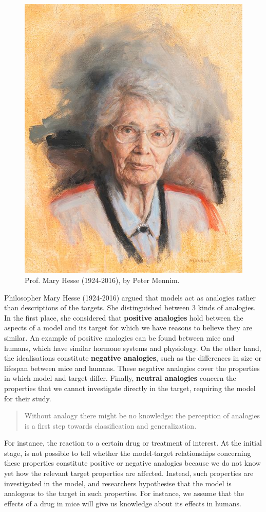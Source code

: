 \documentclass[
]{book}
\begin{document}
\begin{figure}  
 \begin{center}
    \includegraphics[width=.33\textwidth]{Figures/mary-hesse.jpeg}  
  \captionsetup{labelformat=empty}
  \caption{Prof. Mary Hesse (1924-2016), by Peter Mennim.} 
\end{center}
\end{figure}
\addtocounter{figure}{-1}

Philosopher Mary Hesse (1924-2016) argued that models act as analogies rather than descriptions of the targets. She distinguished between 3 kinds of analogies. In the first place, she considered that \textbf{positive analogies} hold between the aspects of a model and its target for which we have reasons to believe they are similar. An example of positive analogies can be found between mice and humans, which have similar hormone systems and physiology. On the other hand, the idealisations constitute \textbf{negative analogies}, such as the differences in size or lifespan between mice and humans. These negative analogies cover the properties in which model and target differ. Finally, \textbf{neutral analogies} concern the properties that we cannot investigate directly in the target, requiring the model for their study.

\begin{quote}
Without analogy there might be no knowledge: the perception of analogies is a first step towards classification and generalization. \citep{bunge2012method}
\end{quote}

For instance, the reaction to a certain drug or treatment of interest. At the initial stage, is not possible to tell whether the model-target relationships concerning these properties constitute positive or negative analogies because we do not know yet how the relevant target properties are affected. Instead, such properties are investigated in the model, and researchers hypothesise that the model is analogous to the target in such properties. For instance, we assume that the effects of a drug in mice will give us knowledge about its effects in humans.
\end{document}
